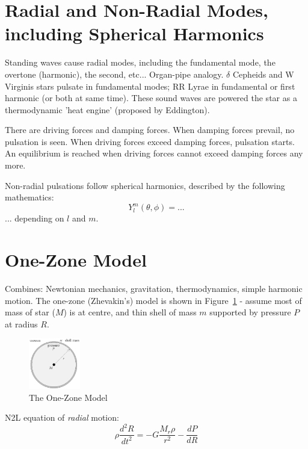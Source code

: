 \documentclass{spy}
\begin{document}
\section{Radial and Non-Radial Modes, including Spherical Harmonics}
Standing waves cause radial modes, including the fundamental mode, the overtone (harmonic), the second, etc... Organ-pipe analogy. 
\(\delta\) Cepheids and W Virginis stars pulsate in fundamental modes; RR Lyrae in fundamental or first harmonic (or both at same time).  
These sound waves are powered the star as a thermodynamic 'heat engine' (proposed by Eddington). 

There are driving forces and damping forces. When damping forces prevail, no pulsation is seen. When driving forces exceed damping forces, pulsation starts. An equilibrium is reached when driving forces cannot exceed damping forces any more. 

Non-radial pulsations follow spherical harmonics, described by the following mathematics:
\begin{equation}
    Y^m_l (\theta, \phi) = ...
\end{equation}
... depending on \(l\) and \(m\). 


\section{One-Zone Model}
Combines: Newtonian mechanics, gravitation, thermodynamics, simple harmonic motion.
The one-zone (Zhevakin's) model is shown in Figure~\ref{one_zone_model_diagram} - assume most of mass of star (\(M\)) is at centre, and thin shell of mass \(m\) supported by pressure \(P\) at radius \(R\). 



\begin{figure}[h]
    \centering
    \includegraphics[width=0.2\textwidth]{one_zone_model.eps}
    \caption{The One-Zone Model} 
    \label{one_zone_model_diagram}
\end{figure}

N2L equation of \textit{radial} motion:
\begin{equation}
    \rho \frac{d^2R}{dt^2} = -G \frac{M_r \rho}{r^2} - \frac{dP}{dR}
\end{equation}
\end{document}
